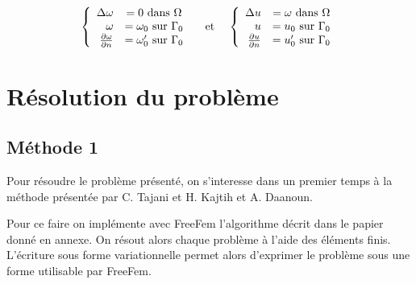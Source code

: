 \begin{equation}
	\begin{array}{r c l}
		\left\{\begin{array}{r c l}
			       \Delta \omega &= 0 \text{ dans } \Omega \\
			       \omega &=\omega_0 \text{ sur } \Gamma_0\\
			       \frac{\partial \omega}{\partial n} &= \omega^\prime_0 \text{ sur } \Gamma_0
		\end{array}\right.

		& \text{ et } &
		\left\{\begin{array}{r c l}
			       \Delta u &=  \omega \text{ dans } \Omega \\
			       u &=u_0 \text{ sur } \Gamma_0\\
			       \frac{\partial u}{\partial n} &= u^\prime_0 \text{ sur } \Gamma_0
		\end{array}\right.
	\end{array}
\end{equation}

\section{Résolution du problème}\label{sec:résolution-du-problème}
\subsection{Méthode 1}\label{subsec:méthode-1}
Pour résoudre le problème présenté, on s'interesse dans un premier temps à la méthode présentée par C. Tajani et H.
Kajtih et A. Daanoun.

Pour ce faire on implémente avec FreeFem l'algorithme décrit dans le papier donné en annexe.
On résout alors chaque problème à l'aide des éléments finis.
L'écriture sous forme variationnelle permet alors d'exprimer le problème sous une forme utilisable par FreeFem.


